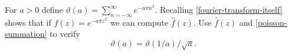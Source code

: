 \documentclass{homework}
\begin{document}
                                                                                  \begin{problem}\label{modularity}For $a > 0$ define
                                                                                    $\vartheta(a) = \sum_{n=-\infty}^\infty e^{-a \pi n^2}$.  Recalling
                                                                                      \ref{fourier-transform-itself} shows that if $f(z) = e^{-a \pi z^2}$
                                                                                        we can compute $\hat{f}(z)$.  Use $\hat{f}(z)$ and
                                                                                          \ref{poisson-summation} to verify
                                                                                            \[
                                                                                                \vartheta(a) = \vartheta(1/a) / \sqrt{a}.
                                                                                                  \]
                                                                                                  \end{problem}
\end{document}
